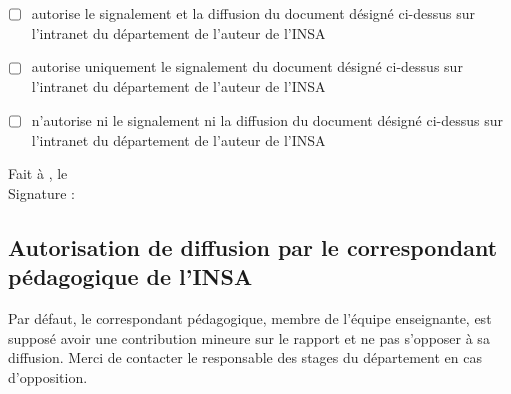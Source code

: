 \begin{itemize}
    \item ☐ autorise le signalement et la diffusion du document désigné ci-dessus sur l’intranet du département de l'auteur de l’INSA
    \item ☐ autorise uniquement le signalement du document désigné ci-dessus sur l’intranet du département de l'auteur de l’INSA
    \item ☐ n’autorise ni le signalement ni la diffusion du document désigné ci-dessus sur l’intranet du département de l'auteur de l’INSA
\end{itemize}

Fait à \underline{\hspace{3cm}}, le \underline{\hspace{3cm}} \\
Signature : \underline{\hspace{5cm}}

\subsection*{Autorisation de diffusion par le correspondant pédagogique de l’INSA}
Par défaut, le correspondant pédagogique, membre de l’équipe enseignante, est supposé avoir une contribution mineure sur le rapport et ne pas s’opposer à sa diffusion. Merci de contacter le responsable des stages du département en cas d’opposition.


